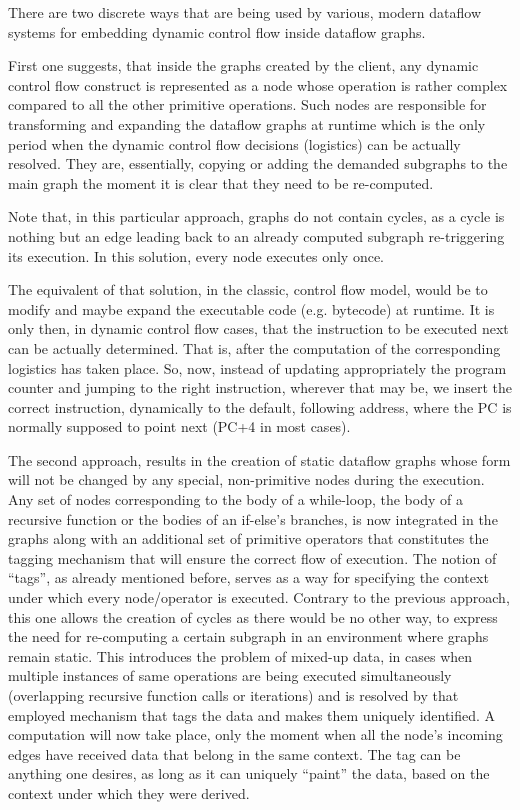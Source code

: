 \documentclass[ack,preface]{dithesis}
\begin{document}
There are two discrete ways that are being used by various, modern dataflow systems for embedding dynamic control flow inside dataflow graphs. 

First one suggests, that inside the graphs created by the client, any dynamic control flow construct is represented as a node whose operation is rather complex compared to all the other primitive operations. Such nodes are responsible for transforming and expanding the dataflow graphs at runtime which is the only period when the dynamic control flow decisions (logistics) can be actually resolved. They are, essentially, copying or adding the demanded subgraphs to the main graph the moment it is clear that they need to be re-computed.

Note that, in this particular approach, graphs do not contain cycles, as a cycle is nothing but an edge leading back to an already computed subgraph re-triggering its execution. In this solution, every node executes only once.

The equivalent of that solution, in the classic, control flow model, would be to modify and maybe expand the executable code (e.g. bytecode) at runtime. It is only then, in dynamic control flow cases, that the instruction to be executed next can be actually determined. That is, after the computation of the corresponding logistics has taken place. So, now, instead of updating appropriately the program counter and jumping to the right instruction, wherever that may be, we insert the correct instruction, dynamically to the default, following address, where the PC is normally supposed to point next (PC+4 in most cases).

The second approach, results in the creation of static dataflow graphs whose form will not be changed by any special, non-primitive nodes during the execution. Any set of nodes corresponding to the body of a while-loop, the body of a recursive function or the bodies of an if-else’s branches, is now integrated in the graphs along with an additional set of primitive operators that constitutes the tagging mechanism that will ensure the correct flow of execution. The notion of “tags”, as already mentioned before, serves as a way for specifying the context under which every node/operator is executed. Contrary to the previous approach, this one allows the creation of cycles as there would be no other way, to express the need for re-computing a certain subgraph in an environment where graphs remain static. This introduces the problem of mixed-up data, in cases when multiple instances of same operations are being executed simultaneously (overlapping recursive function calls or iterations) and is resolved by that employed mechanism that tags the data and makes them uniquely identified. A computation will now take place, only the moment when all the node’s incoming edges have received data that belong in the same context. The tag can be anything one desires, as long as it can uniquely “paint” the data, based on the context under which they were derived.
\end{document}
